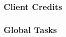 \subsubsection{Client Credits}
\subsubsection{Global Tasks}


\begin{comment}
- This is supposed to be the core of your thesis or project. Describe your work from a con-ceptual viewpoint.
- Example: In case you have developed some prototypical tool in your bachelor thesis, demonstrate how it is employed in its business context. More concrete example: Assume that your contribution is a Maven-Build-Plugin that further automates the deployment of changes to the claim handling process into production. In this case show how the plugin is integrated in the overall (continuous) integration and deployment process, which human ac-tors are involved, which external systems and so on. Elaborate on subtle edge cases you had to deal with, e.g., possible outages of external systems.
- Usedi  agramswhere appropriate. Standard notations are better than informal box-and-line-diagrams. Typical standard notations for a solution concept are
  - Business Process Modelling Notation (BPMN) or UML activity diagrams, that depict a workflow in which your tool is used
  - UML component diagrams, where your tool is represented by just a single component (without its ingredients) together with connected external systems
\end{comment}
